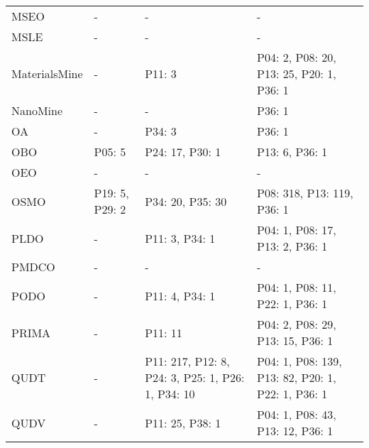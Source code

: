 \begin{tabular}{m{4cm}m{3cm}m{3cm}m{5cm}}
                   MSEO &              - &                                                 - &                                                         - \\
                   MSLE &              - &                                                 - &                                                         - \\
          MaterialsMine &              - &                                            P11: 3 &                  P04: 2, P08: 20, P13: 25, P20: 1, P36: 1 \\
               NanoMine &              - &                                                 - &                                                    P36: 1 \\
                     OA &              - &                                            P34: 3 &                                                    P36: 1 \\
                    OBO &         P05: 5 &                                   P24: 17, P30: 1 &                                            P13: 6, P36: 1 \\
                    OEO &              - &                                                 - &                                                         - \\
                   OSMO & P19: 5, P29: 2 &                                  P34: 20, P35: 30 &                                P08: 318, P13: 119, P36: 1 \\
                   PLDO &              - &                                    P11: 3, P34: 1 &                           P04: 1, P08: 17, P13: 2, P36: 1 \\
                  PMDCO &              - &                                                 - &                                                         - \\
                   PODO &              - &                                    P11: 4, P34: 1 &                           P04: 1, P08: 11, P22: 1, P36: 1 \\
                  PRIMA &              - &                                           P11: 11 &                          P04: 2, P08: 29, P13: 15, P36: 1 \\
                   QUDT &              - & P11: 217, P12: 8, P24: 3, P25: 1, P26: 1, P34: 10 &         P04: 1, P08: 139, P13: 82, P20: 1, P22: 1, P36: 1 \\
                   QUDV &              - &                                   P11: 25, P38: 1 &                          P04: 1, P08: 43, P13: 12, P36: 1 \\

\end{tabular}
